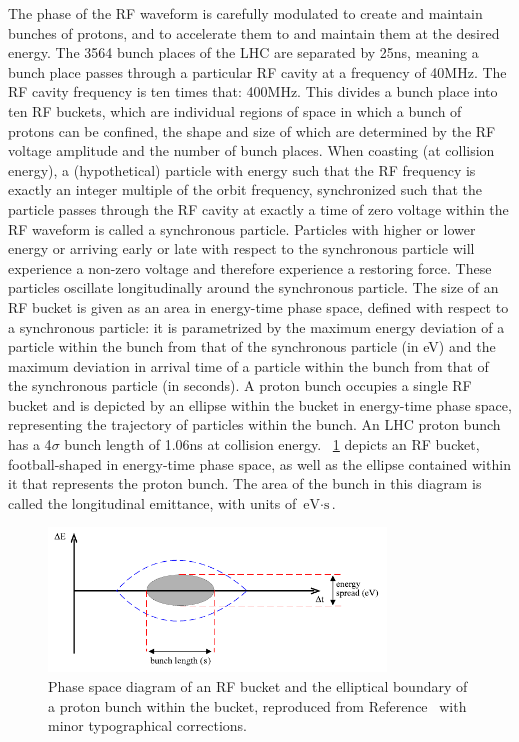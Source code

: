 The phase of the RF waveform is carefully modulated to create and maintain bunches of protons, and to accelerate them to and maintain them at the desired energy.
The 3564 bunch places of the LHC are separated by 25\unit{ns}, meaning a bunch place passes through a particular RF cavity at a frequency of 40\unit{MHz}.
The RF cavity frequency is ten times that: 400\unit{MHz}.
This divides a bunch place into ten RF buckets, which are individual regions of space in which a bunch of protons can be confined, the shape and size of which are determined by the RF voltage amplitude and the number of bunch places.
When coasting (at collision energy), a (hypothetical) particle with energy such that the RF frequency is exactly an integer multiple of the orbit frequency, synchronized such that the particle passes through the RF cavity at exactly a time of zero voltage within the RF waveform is called a synchronous particle.
Particles with higher or lower energy or arriving early or late with respect to the synchronous particle will experience a non-zero voltage and therefore experience a restoring force.
These particles oscillate longitudinally around the synchronous particle.
The size of an RF bucket is given as an area in energy-time phase space, defined with respect to a synchronous particle: it is parametrized by the maximum energy deviation of a particle within the bunch from that of the synchronous particle (in \unit{eV}) and the maximum deviation in arrival time of a particle within the bunch from that of the synchronous particle (in seconds).
A proton bunch occupies a single RF bucket and is depicted by an ellipse within the bucket in energy-time phase space, representing the trajectory of particles within the bunch.
An LHC proton bunch has a 4$\sigma$ bunch length of 1.06\unit{ns} at collision energy.
\Fig~\ref{cms:rfbucket} depicts an RF bucket, football-shaped in energy-time phase space, as well as the ellipse contained within it that represents the proton bunch. The area of the bunch in this diagram is called the longitudinal emittance, with units of $\text{eV}\cdot\text{s}$.

\begin{figure}[p]
  \centering
  \includegraphics[width=0.8\textwidth]{figures/cms/RFBucket.pdf}
  \caption[Phase space diagram of an RF bucket and the elliptical boundary of a proton bunch within the bucket.]{Phase space diagram of an RF bucket and the elliptical boundary of a proton bunch within the bucket, reproduced from Reference~\cite{Baird:1017689} with minor typographical corrections.}
  \label{cms:rfbucket}
\end{figure}

